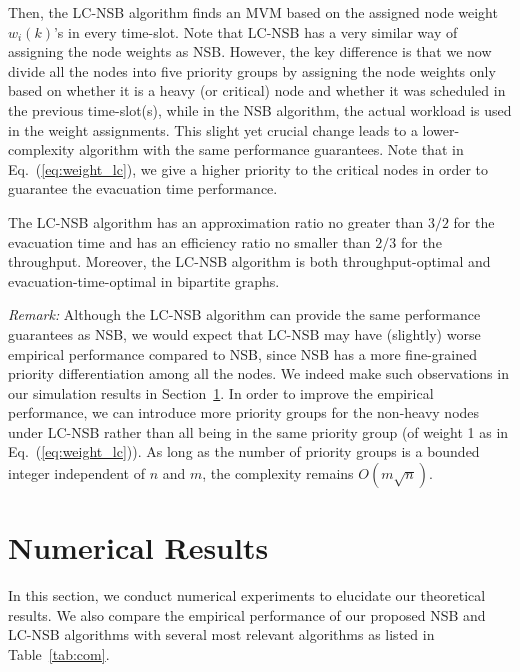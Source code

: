 \documentclass[10pt,journal,compsoc]{IEEEtran}
\newcommand{\HIGH}[1]{{\color{black}{#1}}}
\begin{document}
Then, the LC-NSB algorithm finds an MVM based on the assigned node weight $w_i(k)$'s in every time-slot. 
Note that LC-NSB has a very similar way of assigning the node weights as NSB. However, the key difference 
is that we now divide all the nodes into five priority groups by assigning the node weights only based on 
whether it is a heavy (or critical) node and whether it was scheduled in the previous time-slot(s), while in 
the NSB algorithm, the actual workload is used in the weight assignments. This slight yet crucial change 
leads to a lower-complexity algorithm with the same performance guarantees. Note that in Eq.~(\ref{eq:weight_lc}), 
we give a higher priority to the critical nodes in order to guarantee the evacuation time performance.
\HIGH{The proof follows a similar line of analysis to that for the NSB algorithm and is provided in the appendix for completeness.}

\begin{theorem}
\label{thm:lc_nsb}
The LC-NSB algorithm has an approximation ratio no greater than $3/2$ for the evacuation time and has an 
efficiency ratio no smaller than $2/3$ for the throughput. 
Moreover, the LC-NSB algorithm is both throughput-optimal and evacuation-time-optimal in bipartite graphs.
\end{theorem}



\emph{Remark:} Although the LC-NSB algorithm can provide the same performance guarantees as NSB, 
we would expect that LC-NSB may have (slightly) worse empirical performance compared to NSB, since 
NSB has a more fine-grained priority differentiation among all the nodes. We indeed make such observations 
in our simulation results in Section~\ref{sec:sim}. In order to improve the empirical performance, we can 
introduce more priority groups for the non-heavy nodes under LC-NSB rather than all being in the same 
priority group (of weight 1 as in Eq.~(\ref{eq:weight_lc})). As long as the number of priority groups is 
a bounded integer independent of $n$ and $m$, the complexity remains $O(m \sqrt{n})$.




\section{Numerical Results} \label{sec:sim}
In this section, we conduct numerical experiments to elucidate our theoretical results. We also compare the empirical 
performance of our proposed NSB and LC-NSB algorithms with several most relevant algorithms as listed in Table~\ref{tab:com}.
\end{document}
